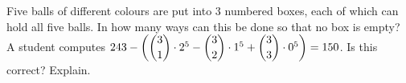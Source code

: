 Five balls of different colours are put into $3$ numbered boxes, each of which can hold all five balls. In how many ways can this be done so that no box is empty? A student computes $243-\left(\dbinom31\cdot2^5-\dbinom32\cdot1^5+\dbinom33\cdot0^5\right)=150$. Is this correct? Explain.
